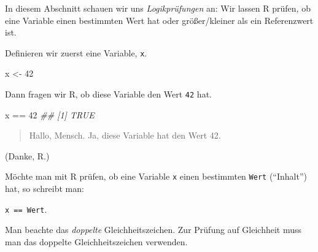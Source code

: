 \documentclass[
  a4paper,
]{scrbook}
\newenvironment{Shaded}{\begin{snugshade}}{\end{snugshade}}
\newcommand{\DecValTok}[1]{\textcolor[rgb]{0.68,0.00,0.00}{#1}}
\newcommand{\DocumentationTok}[1]{\textcolor[rgb]{0.37,0.37,0.37}{\textit{#1}}}
\newcommand{\NormalTok}[1]{\textcolor[rgb]{0.00,0.23,0.31}{#1}}
\newcommand{\OtherTok}[1]{\textcolor[rgb]{0.00,0.23,0.31}{#1}}
\newcommand{\SpecialCharTok}[1]{\textcolor[rgb]{0.37,0.37,0.37}{#1}}
\theoremstyle{definition}
\theoremstyle{definition}
\theoremstyle{definition}
\theoremstyle{remark}
\begin{document}
In diesem Abschnitt schauen wir uns \emph{Logikprüfungen} an: Wir lassen
R prüfen, ob eine Variable einen bestimmten Wert hat oder größer/kleiner
als ein Referenzwert ist.

Definieren wir zuerst eine Variable, \texttt{x}.

\begin{Shaded}
\begin{Highlighting}[]
\NormalTok{x }\OtherTok{\textless{}{-}} \DecValTok{42}
\end{Highlighting}
\end{Shaded}

Dann fragen wir R, ob diese Variable den Wert \texttt{42} hat.

\begin{Shaded}
\begin{Highlighting}[]
\NormalTok{x }\SpecialCharTok{==} \DecValTok{42}
\DocumentationTok{\#\# [1] TRUE}
\end{Highlighting}
\end{Shaded}

\begin{quote}
{} Hallo, Mensch. Ja, diese Variable hat den Wert 42.
\end{quote}

(Danke, R.)

Möchte man mit R prüfen, ob eine Variable \texttt{x} einen bestimmten
\texttt{Wert} (``Inhalt'') hat, so schreibt man:

\texttt{x\ ==\ Wert}.

\begin{tcolorbox}[enhanced jigsaw, colbacktitle=quarto-callout-important-color!10!white, bottomrule=.15mm, left=2mm, breakable, rightrule=.15mm, coltitle=black, title=\textcolor{quarto-callout-important-color}{\faExclamation}\hspace{0.5em}{Wichtig}, colback=white, leftrule=.75mm, titlerule=0mm, opacityback=0, bottomtitle=1mm, toprule=.15mm, arc=.35mm, toptitle=1mm, opacitybacktitle=0.6, colframe=quarto-callout-important-color-frame]

Man beachte das \emph{doppelte} Gleichheitszeichen. Zur Prüfung auf
Gleichheit muss man das doppelte Gleichheitszeichen verwenden.

\end{tcolorbox}
\end{document}
